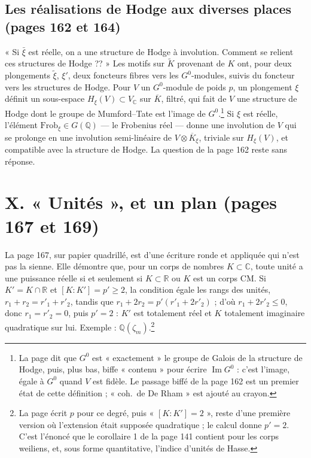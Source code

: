 \documentclass[11pt,a4paper]{article}
\begin{document}
\subsection*{Les réalisations de Hodge aux diverses places (pages 162 et 164)}

« Si $\bar{\xi}$ est réelle, on a une structure de Hodge à involution. Comment se
relient ces structures de Hodge ?? » Les motifs sur $\widetilde{K}$ provenant
de $K$ ont, pour deux plongements $\tilde{\xi}$, $\xi'$, deux foncteurs fibres
vers les $G^{0}$-modules, suivis du foncteur vers les structures de Hodge. Pour
$V$ un $G^{0}$-module de poids $p$, un plongement $\xi$ définit un sous-espace
$H_{\xi}(V) \subset V_{\mathbb{C}}$ sur $\overline{K}$, filtré, qui fait de $V$
une structure de Hodge dont le groupe de Mumford--Tate est l'image de
$G^{0}$.\footnote{La page dit que $G^{0}$ est « exactement » le groupe de Galois de
la structure de Hodge, puis, plus bas, biffe « contenu » pour écrire
$\operatorname{Im} G^{0}$ : c'est l'image, égale à $G^{0}$ quand $V$ est fidèle.
Le passage biffé de la page 162 est un premier état de cette définition ; « coh.\
de De Rham » est ajouté au crayon.} Si $\xi$ est réelle, l'élément
$\mathrm{Frob}_{\xi} \in G(\mathbb{Q})$ --- le Frobenius réel --- donne une
involution de $V$ qui se prolonge en une involution semi-linéaire de $V
\otimes \overline{K}_{\xi}$, triviale sur $H_{\xi}(V)$, et compatible avec la
structure de Hodge. La question de la page 162 reste sans réponse.

\section*{X. « Unités », et un plan (pages 167 et 169)}

La page 167, sur papier quadrillé, est d'une écriture ronde et appliquée qui
n'est pas la sienne. Elle démontre que, pour un corps de nombres $K \subset
\mathbb{C}$, toute unité a une puissance réelle si et seulement si $K \subset
\mathbb{R}$ ou $K$ est un corps CM. Si $K' = K \cap \mathbb{R}$ et $[K : K'] =
p' \geqslant 2$, la condition égale les rangs des unités, $r_{1} + r_{2} =
r'_{1} + r'_{2}$, tandis que $r_{1} + 2r_{2} = p'(r'_{1} + 2r'_{2})$ ; d'où
$r_{1} + 2r'_{2} \leqslant 0$, donc $r_{1} = r'_{2} = 0$, puis $p' = 2$ : $K'$
est totalement réel et $K$ totalement imaginaire quadratique sur lui. Exemple :
$\mathbb{Q}(\zeta_{m})$.\footnote{La page écrit $p$ pour ce degré, puis
« $[K : K'] = 2$ », reste d'une première version où l'extension était supposée
quadratique ; le calcul donne $p' = 2$. C'est l'énoncé que le corollaire 1 de la
page 141 contient pour les corps weiliens, et, sous forme quantitative, l'indice
d'unités de Hasse.}
\end{document}
